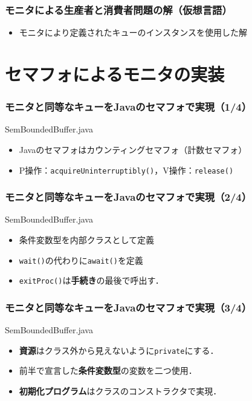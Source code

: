 \documentclass{beamer}                   %
\begin{document}
\begin{frame}
  \frametitle{モニタによる生産者と消費者問題の解（仮想言語）}

  \begin{itemize}
  \item モニタにより定義されたキューのインスタンスを使用した解
  \end{itemize}
\end{frame}

\section{セマフォによるモニタの実装}
\begin{frame}
  \frametitle{モニタと同等なキューをJavaのセマフォで実現（1/4）}
      {SemBoundedBuffer.java}

  \begin{itemize}
  \item Javaのセマフォはカウンティングセマフォ（計数セマフォ）
  \item P操作：{\tt acquireUninterruptibly()}，V操作：{\tt release()}
  \end{itemize}
\end{frame}

\begin{frame}
  \frametitle{モニタと同等なキューをJavaのセマフォで実現（2/4）}
      {SemBoundedBuffer.java}

  \begin{itemize}
  \item 条件変数型を内部クラスとして定義
  \item {\tt wait()}の代わりに{\tt await()}を定義
  \item {\tt exitProc()}は{\bf 手続き}の最後で呼出す．
  \end{itemize}
\end{frame}

\begin{frame}
  \frametitle{モニタと同等なキューをJavaのセマフォで実現（3/4）}
                  {SemBoundedBuffer.java}

  \begin{itemize}
  \item {\bf 資源}はクラス外から見えないように{\tt private}にする．
  \item 前半で宣言した{\bf 条件変数型}の変数を二つ使用．
  \item {\bf 初期化プログラム}はクラスのコンストラクタで実現．
  \end{itemize}
\end{frame}
\end{document}
